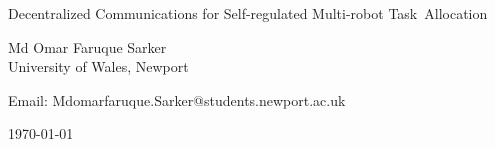 %
%
%
%

\begin{titlepage}

\begin{center}
\noindent
\huge
Decentralized Communications for Self-regulated Multi-robot Task~Allocation
\end{center}

\begin{center}
\noindent
\huge
Md Omar Faruque Sarker\\[10pt]
\large
University of Wales, Newport\\[16pt]
\end{center}

%

\begin{center}
\noindent
Email: Mdomarfaruque.Sarker@students.newport.ac.uk \\
\end{center}

\begin{center}
\noindent
\today
\end{center}

\end{titlepage}

	
